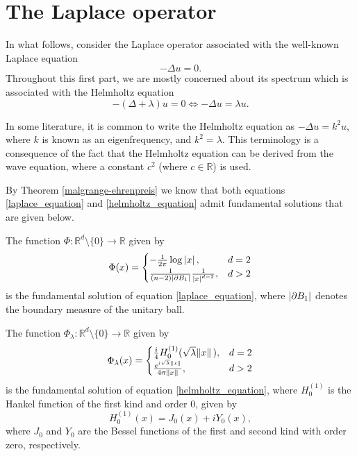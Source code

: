 \section{The Laplace operator}
\label{section:laplace_op}

In what follows, consider the Laplace operator associated with the well-known Laplace equation
\begin{equation} \label{laplace_equation}
    -\Delta u = 0.
\end{equation}
Throughout this first part, we are mostly concerned about its spectrum which is associated with the Helmholtz equation
\begin{equation} \label{helmholtz_equation}
    -(\Delta+\lambda) u = 0 \iff -\Delta u = \lambda u.
\end{equation}

\begin{remark}
    In some literature, it is common to write the Helmholtz equation as \(-\Delta u = k^2 u\), where \(k\) is known as an eigenfrequency, and \(k^2 = \lambda\). This terminology is a consequence of the fact that the Helmholtz equation can be derived from the wave equation, where a constant \(c^2\) (where \(c \in \mathbb{R}\)) is used.
\end{remark}

By Theorem \ref{malgrange-ehrenpreis} we know that both equations \eqref{laplace_equation} and \eqref{helmholtz_equation} admit fundamental solutions that are given below.

\begin{proposition}
    The function \(\Phi: \mathbb{R}^d \setminus \{0\} \rightarrow \mathbb{R}\) given by
    \[
    \Phi(x) = \begin{cases}
        -\frac{1}{2 \pi} \log \abs*{x}, & d=2\\
        \frac{1}{(n-2)\abs{\partial B_1}}\frac{1}{\abs*{x}^{d-2}}, & d > 2
    \end{cases}    
    \]
    is the fundamental solution of equation \eqref{laplace_equation}, where \(\abs{\partial B_1}\) denotes the boundary measure of the unitary ball.
\end{proposition}
\begin{proposition}\label{helm_fund_sol}
    The function \(\Phi_\lambda: \mathbb{R}^d \setminus \{0\} \rightarrow \mathbb{R}\) given by
    \[
    \Phi_\lambda(x) = \begin{cases}
        \frac{i}{4} H_0^{(1)}(\sqrt{\lambda} \norm*{x}), & d=2\\
        \frac{e^{i \sqrt{\lambda} \norm*{x}}}{4 \pi \norm*{x}}, & d > 2
    \end{cases}    
    \]
    is the fundamental solution of equation \eqref{helmholtz_equation}, where \(H_0^{(1)}\) is the Hankel function of the first kind and order 0, given by
    \[
        H_0^{(1)}(x) = J_0(x) + i Y_0(x),
    \]
    where \(J_0\) and \(Y_0\) are the Bessel functions of the first and second kind with order zero, respectively.
\end{proposition}

